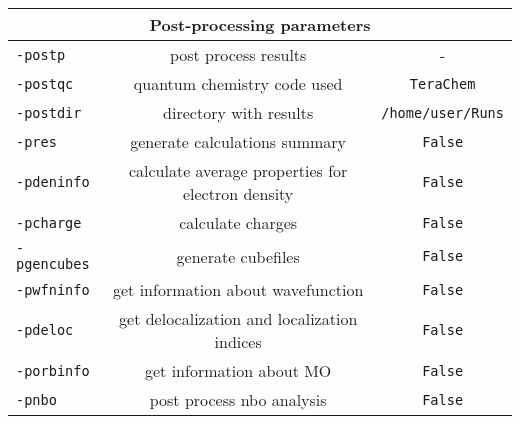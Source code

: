 \documentclass[a4paper,12pt]{assignment}
\begin{document}
\begin{tabular}{|l|c|c|}
\hline
\multicolumn{3}{|c|}{\Large\textbf{Post-processing parameters}}\\ \hline
\texttt{-postp} & post process results & - \\
\texttt{-postqc} & quantum chemistry code used & \texttt{TeraChem} \\
\texttt{-postdir} & directory with results & \texttt{/home/user/Runs} \\
\texttt{-pres} & generate calculations summary & \texttt{False} \\
\texttt{-pdeninfo} &  calculate average properties for electron density & \texttt{False} \\
\texttt{-pcharge} &   calculate charges & \texttt{False} \\
\texttt{-pgencubes} & generate cubefiles & \texttt{False} \\
\texttt{-pwfninfo} & get information about wavefunction & \texttt{False} \\
\texttt{-pdeloc} &     get delocalization and localization indices & \texttt{False} \\
\texttt{-porbinfo} & get information about MO & \texttt{False} \\
\texttt{-pnbo} & post process nbo analysis & \texttt{False} \\
\hline
\end{tabular}
\end{document}
